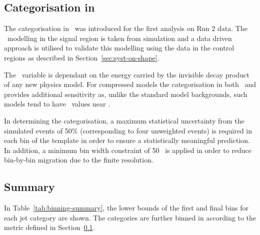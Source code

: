 \subsection{Categorisation in \mht}
\label{sec:cat-mht}
The categorisation in \mht~was introduced for the first analysis on
Run 2 data. The \mht~modelling in the signal region is taken from 
simulation and a data driven approach is utilised to validate 
this modelling using the data in the control regions as described 
in Section~\ref{sec:syst-on-shape}.

The \mht~variable is dependant on the energy carried by
the invisible decay product of any new physics model. For compressed 
models the categorisation in both \scalht~and \mht provides additional 
sensitivity as, unlike the standard model backgrounds, such models tend to 
have \mht~values near \scalht. 

In determining the categorisation, a maximum statistical uncertainty from the 
simulated events of 50\% (corresponding to four unweighted events) 
is required in each bin of the template in order to ensure a statistically meaningful prediction. 
In addition, a minimum bin width constraint of 50 \GeV~is applied in order to reduce bin-by-bin migration 
due to the finite \mht resolution.

\subsection{Summary}

In Table~\ref{tab:binning-summary}, the lower bounds of the first and final \scalht
bins for each jet category are shown. The categories are further binned in \mht
according to the metric defined in Section~\ref{sec:cat-mht}.

